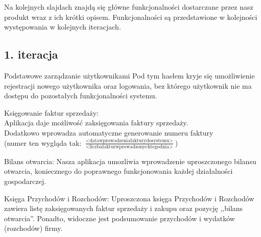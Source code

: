 \documentclass{beamer}
\begin{document}
  \begin{frame}
    \begin{block}{}
      Na kolejnych slajdach znajdą się główne funkcjonalności dostarczane przez nasz produkt wraz z ich krótki opisem. Funkcjonalności są przedstawione w kolejności występowania w kolejnych iteracjach.
    \end{block}
  \end{frame}
\subsection{1. iteracja}
  \begin{frame}
    \begin{block}{}
      Podstawowe zarządzanie użytkownikami Pod tym hasłem kryje się umożliwienie rejestracji nowego użytkownika oraz logowania, bez którego użytkownik nie ma dostępu do pozostałych funkcjonalności systemu.
    \end{block}
  \end{frame}
  \begin{frame}
    \begin{block}{}
      Księgowanie faktur sprzedaży:\\
      Aplikacja daje możliwość zaksięgowania faktury sprzedaży.\\
      Dodatkowo wprowadza automatyczne generowanie numeru faktury\\
      (numer ten wygląda tak: $\frac{\operatorname{<data wprowadzenia faktury do systemu>}}{\operatorname{<liczba faktur wprowadzonych tego dnia>}}$)
    \end{block}
  \end{frame}
  \begin{frame}
    \begin{block}{}
      Bilans otwarcia: Nasza aplikacja umozliwia wprowadzenie uproszczonego bilansu otwarcia, koniecznego do poprawnego funkcjonowania każdej działalności gospodarczej.
    \end{block}
  \end{frame}
  \begin{frame}
    \begin{block}{}
      Księga Przychodów i Rozchodów: Uproszczona księga Przychodów i Rozchodów zawiera listę zaksięgowanych faktur sprzedaży i zakupu oraz pozycję ,,bilans otwarcia''. Ponadto, widoczne jest podsumowanie przychodów i wydatków (rozchodów) firmy.
    \end{block}
  \end{frame}
\end{document}

